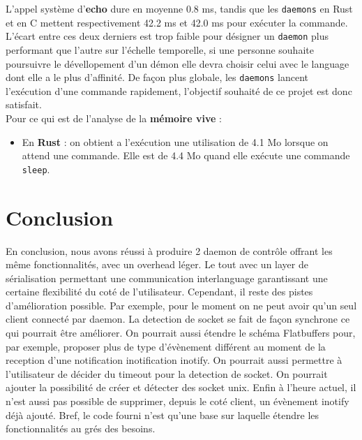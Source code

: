 \documentclass{article}
\begin{document}
L'appel système d'\textbf{echo} dure en moyenne 0.8 ms, tandis que les \texttt{daemons} en Rust et en C mettent respectivement 42.2 ms et 42.0 ms pour exécuter la commande. L'écart entre ces deux derniers est trop faible pour désigner un \texttt{daemon} plus performant que l'autre sur l'échelle temporelle, si une personne souhaite poursuivre le dévellopement d'un démon elle devra choisir celui avec le language dont elle a le plus d'affinité. De façon plus globale, les \texttt{daemons} lancent l'exécution d'une commande rapidement, l'objectif souhaité de ce projet est donc satisfait.\\

Pour ce qui est de l'analyse de la \textbf{mémoire vive} :
\begin{itemize}
    \item En \textbf{Rust} : on obtient a l'exécution une utilisation de 4.1 Mo lorsque on attend une commande. Elle est de 4.4 Mo quand elle exécute une commande \texttt{sleep}.
\end{itemize}

\section{Conclusion}

En conclusion, nous avons réussi à produire 2 daemon de contrôle offrant les même fonctionnalités, avec un overhead léger. Le tout avec un layer de sérialisation permettant une communication interlanguage garantissant une certaine flexibilité du coté de l'utilisateur. Cependant, il reste des pistes d'amélioration possible. Par exemple, pour le moment on ne peut avoir qu'un seul client connecté par daemon. La detection de socket se fait de façon synchrone ce qui pourrait être améliorer. On pourrait aussi étendre le schéma Flatbuffers pour, par exemple, proposer plus de type d'évènement différent au moment de la reception d'une notification inotification inotify. On pourrait aussi permettre à l'utilisateur de décider du timeout pour la detection de socket. On pourrait ajouter la possibilité de créer et détecter des socket unix. Enfin à l'heure actuel, il n'est aussi pas possible de supprimer, depuis le coté client, un évènement inotify déjà ajouté.
Bref, le code fourni n'est qu'une base sur laquelle étendre les fonctionnalités au grés des besoins.  
\end{document}
